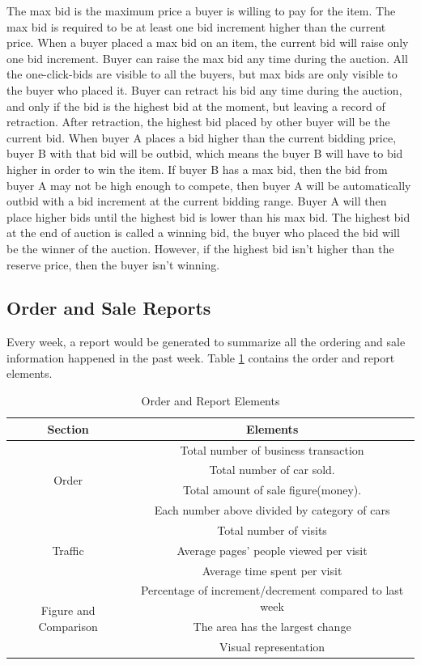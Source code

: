 \documentclass[12pt]{article}
\begin{document}
\par The max bid is the maximum price a buyer is willing to pay for the item. The max bid is required to be at least one bid increment higher than the current price. When a buyer placed a max bid on an item, the current bid will raise only one bid increment. Buyer can raise the max bid any time during the auction. All the one-click-bids are visible to all the buyers, but max bids are only visible to the buyer who placed it. Buyer can retract his bid any time during the auction, and only if the bid is the highest bid at the moment, but leaving a record of retraction. After retraction, the highest bid placed by other buyer will be the current bid. When buyer A places a bid higher than the current bidding price, buyer B with that bid will be outbid, which means the buyer B will have to bid higher in order to win the item. If buyer B has a max bid, then the bid from buyer A may not be high enough to compete, then buyer A will be automatically outbid with a bid increment at the current bidding range. Buyer A will then place higher bids until the highest bid is lower than his max bid. The highest bid at the end of auction is called a winning bid, the buyer who placed the bid will be the winner of the auction. However, if the highest bid isn't higher than the reserve price, then the buyer isn't winning.

\subsection{Order and Sale Reports}
Every week, a report would be generated to summarize all the ordering and sale information happened in the past week. Table \ref{report_element} contains the order and report elements.
\begin{table}[!h]
\caption{Order and Report Elements}\label{report_element}
\begin{center}
\begin{tabular}{|c|c|}
\hline
Section & Elements\\ \hline
\multirow{4}{*}{Order} & Total number of business transaction\\
& Total number of car sold.\\
& Total amount of sale figure(money).\\
& Each number above divided by category of cars\\ \hline
\multirow{3}{*}{Traffic} & Total number of visits\\
& Average pages' people viewed per visit\\
& Average time spent per visit\\ \hline
\multirow{3}{*}{Figure and Comparison} & 	Percentage of increment/decrement compared to last week\\
& The area has the largest change\\
& Visual representation \\ \hline
\end{tabular}
\end{center}
\end{table}
\end{document}

